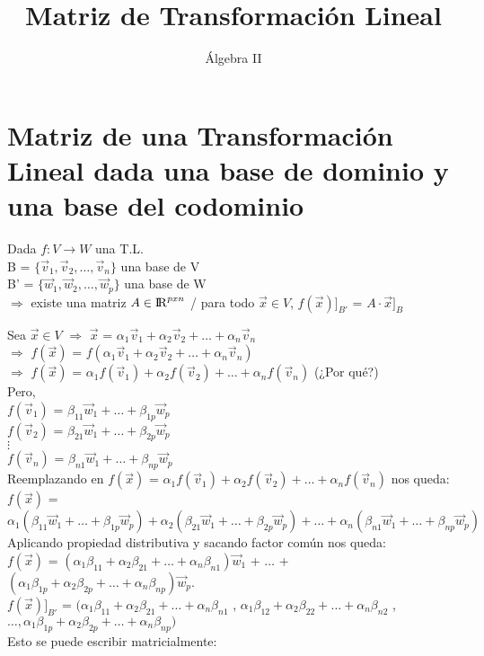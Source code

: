 \documentclass[11pt]{article}
\title{Matriz de Transformación Lineal}
\author{Álgebra II}
\date{\vspace{-5ex}}
\begin{document}
\maketitle{}
\section{Matriz de una Transformación Lineal dada una
base de dominio y una base del codominio}
Dada $f : V \rightarrow W$ una T.L. \\
B = $\{\vec{v}_1 , \vec{v}_2, \hdots, \vec{v}_n\}$ una base de V \\
B' = $\{\vec{w}_1, \vec{w}_2, \hdots, \vec{w}_p\}$ una base de W\\
$\Rightarrow$ existe una matriz $A \in {\rm I\!R}^{pxn}$  / para todo $\vec{x} \in V$, $f(\vec{x})]_{B'}$ = $A \cdot \vec{x}]_B$

\noindent
Sea $\vec{x} \in V$ $\Rightarrow$ $\vec{x}$ = $\alpha_1 \vec{v}_1 + \alpha_2 \vec{v}_2 + \hdots + \alpha_n \vec{v}_n$ \\
$\Rightarrow$ $f(\vec{x})$ = $f(\alpha_1 \vec{v}_1 + \alpha_2 \vec{v}_2 + \hdots + \alpha_n \vec{v}_n)$ \\
$\Rightarrow$ $f(\vec{x})$ = $\alpha_1 f(\vec{v}_1) + \alpha_2 f(\vec{v}_2) + \hdots + \alpha_n f(\vec{v}_n)$ (¿Por qué?)\\
Pero, \\
$f(\vec{v}_1)$ = $\beta_{11} \vec{w}_1 + \hdots + \beta_{1p} \vec{w}_p$\\
$f(\vec{v}_2)$ = $\beta_{21} \vec{w}_1 + \hdots + \beta_{2p} \vec{w}_p$\\
$\vdots$ \\
$f(\vec{v}_n)$ = $\beta_{n1} \vec{w}_1 + \hdots + \beta_{np} \vec{w}_p$ \\
Reemplazando en $f(\vec{x})$ = $\alpha_1 f(\vec{v}_1) + \alpha_2 f(\vec{v}_2) + \hdots + \alpha_n f(\vec{v}_n)$ nos queda: \\
$f(\vec{x})$ = 
$\alpha_1 (\beta_{11} \vec{w}_1 + \hdots + \beta_{1p} \vec{w}_p) 
+ \alpha_2 (\beta_{21} \vec{w}_1 + \hdots + \beta_{2p} \vec{w}_p) 
+ \hdots 
+ \alpha_n (\beta_{n1} \vec{w}_1 + \hdots + \beta_{np} \vec{w}_p)$ \\
Aplicando propiedad distributiva y sacando factor común nos queda: \\
$f(\vec{x})$ =
$(\alpha_1 \beta_{11} + \alpha_2 \beta_{21} + \hdots + \alpha_n \beta_{n1}) \vec{w}_1$ + $\hdots$ +  $(\alpha_1 \beta_{1p} + \alpha_2 \beta_{2p} + \hdots + \alpha_n \beta_{np}) \vec{w}_p$. \\
$f(\vec{x})]_{B'}$ = $(\alpha_1 \beta_{11} + \alpha_2 \beta_{21} + \hdots + \alpha_n \beta_{n1}$ , $\alpha_1 \beta_{12} + \alpha_2 \beta_{22} + \hdots + \alpha_n \beta_{n2}$ , $\hdots , \alpha_1 \beta_{1p} + \alpha_2 \beta_{2p} + \hdots + \alpha_n \beta_{np})$ \\
Esto se puede escribir matricialmente: \\
\end{document}

